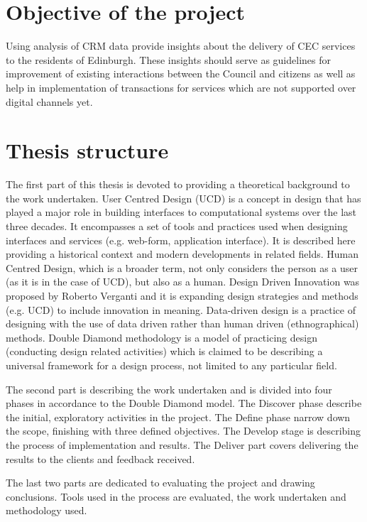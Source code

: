 	\section{Objective of the project}

Using analysis of CRM data provide insights about the delivery of CEC services to the residents of Edinburgh. These insights should serve as guidelines for improvement of existing interactions between the Council and citizens as well as help in implementation of transactions for services which are not supported over digital channels yet.

	\section{Thesis structure}

The first part of this thesis is devoted to providing a theoretical background to the work undertaken. User Centred Design (UCD) is a concept in design that has played a major role in building interfaces to computational systems over the last three decades. It encompasses a set of tools and practices used when designing interfaces and services (e.g. web-form, application interface). It is described here providing a historical context and modern developments in related fields. Human Centred Design, which is a broader term, not only considers the person as a user (as it is in the case of UCD), but also as a human. Design Driven Innovation was proposed by Roberto Verganti and it is expanding design strategies and methods (e.g. UCD) to include innovation in meaning. Data-driven design is a practice of designing with the use of data driven rather than human driven (ethnographical) methods. Double Diamond methodology is a model of practicing design (conducting design related activities) which is claimed to be describing a universal framework for a design process, not limited to any particular field.

The second part is describing the work undertaken and is divided into four phases in accordance to the Double Diamond model. The Discover phase describe the initial, exploratory activities in the project. The Define phase narrow down the scope, finishing with three defined objectives. The Develop stage is describing the process of implementation and results. The Deliver part covers delivering the results to the clients and feedback received.

The last two parts are dedicated to evaluating the project and drawing conclusions. Tools used in the process are evaluated, the work undertaken and methodology used. 